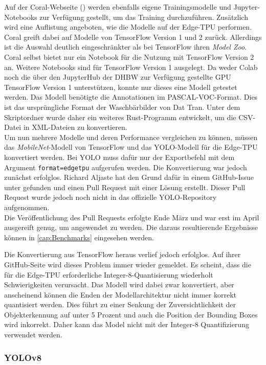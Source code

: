 Auf der Coral-Webseite (\cite{coral_google}) werden ebenfalls eigene Trainingsmodelle und Jupyter-Notebooks zur Verfügung gestellt, um das Training durchzuführen. Zusätzlich wird eine Auflistung angeboten, wie die Modelle auf der Edge-TPU performen.
\\
Coral greift dabei auf Modelle von TensorFlow Version 1 und 2 zurück. Allerdings ist die Auswahl deutlich eingeschränkter als bei TensorFlow ihren \textit{Model Zoo}. Coral selbst bietet nur ein Notebook für die Nutzung mit TensorFlow Version 2 an. Weitere Notebooks sind für TensorFlow Version 1 ausgelegt. Da weder Colab noch die über den JupyterHub der DHBW zur Verfügung gestellte GPU TensorFlow Version 1 unterstützen, konnte nur dieses eine Modell getestet werden. Das Modell benötigte die Annotationen im PASCAL-VOC-Format. Dies ist das ursprüngliche Format der Waschbärbilder von Dat Tran. Unter dem Skriptordner wurde daher ein weiteres Rust-Programm entwickelt, um die CSV-Datei in XML-Dateien zu konvertieren.
\\
Um nun mehrere Modelle und deren Performance vergleichen zu können, müssen das \textit{MobileNet}-Modell von TensorFlow und das \ac{YOLO}-Modell für die Edge-TPU konvertiert werden. Bei \ac{YOLO} muss dafür nur der Exportbefehl mit dem Argument \verb|format=edgetpu| aufgerufen werden. Die Konvertierung war jedoch zunächst erfolglos. Richard Aljaste hat den Grund dafür in einem GitHub-Issue unter \cite{coral_yolo} gefunden und einen Pull Request mit einer Lösung erstellt. Dieser Pull Request wurde jedoch noch nicht in das offizielle \ac{YOLO}-Repository aufgenommen.
\\
Die Veröffentlichung des Pull Requests erfolgte Ende März und war erst im April ausgereift genug, um angewendet zu werden. Die daraus resultierende Ergebnisse können in \ref{cap:Benchmarks} eingesehen werden.

Die Konvertierung aus TensorFlow heraus verlief jedoch erfolglos. Auf ihrer GitHub-Seite wird dieses Problem immer wieder gemeldet. Es scheint, dass die für die Edge-TPU erforderliche Integer-8-Quantisierung wiederholt Schwierigkeiten verursacht. Das Modell wird dabei zwar konvertiert, aber anscheinend können die Enden der Modellarchitektur nicht immer korrekt quantisiert werden. Dies führt zu einer Senkung der Zuversichtlichkeit der Objekterkennung auf unter 5 Prozent und auch die Position der Bounding Boxes wird inkorrekt. Daher kann das Model nicht mit der Integer-8 Quantifizierung verwendet werden.

\subsubsection{\ac{YOLO}v8} \label{cap:yolov8}

